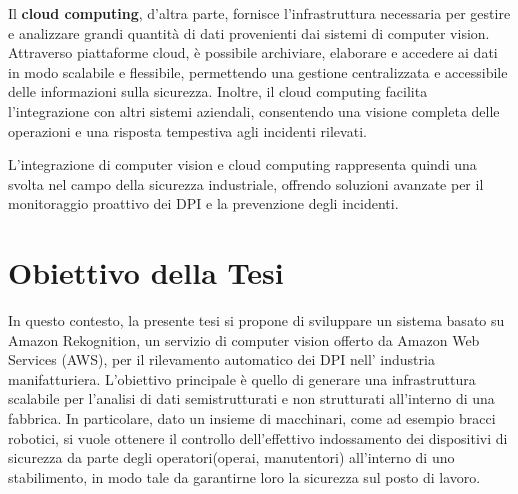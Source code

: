 Il {\bfseries cloud computing}, d'altra parte, fornisce l'infrastruttura necessaria per gestire e analizzare grandi quantità di dati provenienti dai sistemi di computer vision. Attraverso piattaforme cloud, è possibile archiviare, elaborare e accedere ai dati in modo scalabile e flessibile, permettendo una gestione centralizzata e accessibile delle informazioni sulla sicurezza. Inoltre, il cloud computing facilita l'integrazione con altri sistemi aziendali, consentendo una visione completa delle operazioni e una risposta tempestiva agli incidenti rilevati.

L'integrazione di computer vision e cloud computing rappresenta quindi una svolta nel campo della sicurezza industriale, offrendo soluzioni avanzate per il monitoraggio proattivo dei DPI e la prevenzione degli incidenti. 

\section{Obiettivo della Tesi}

In questo contesto, la presente tesi si propone di sviluppare un sistema basato su Amazon Rekognition, un servizio di computer vision offerto da Amazon Web Services (AWS), per il rilevamento automatico dei DPI nell' industria manifatturiera. L'obiettivo principale è quello di generare una infrastruttura scalabile per l’analisi di dati semistrutturati e non strutturati all’interno di una fabbrica. In particolare, dato un insieme di macchinari, come ad esempio bracci robotici, si vuole ottenere il controllo dell’effettivo indossamento dei dispositivi di sicurezza da parte degli operatori(operai, manutentori) all'interno di uno stabilimento, in modo tale da garantirne loro la sicurezza sul posto di lavoro.
